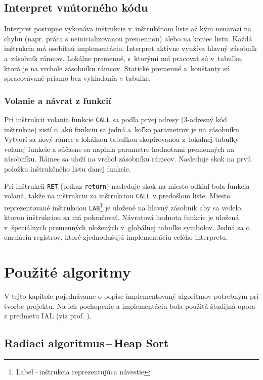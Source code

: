 \documentclass[11pt,a4paper]{article}
\begin{document}
	\subsection{Interpret vnútorného kódu}
	\label{interpret}
	Interpret postupne vykonáva inštrukcie v~inštrukčnom liste až kým nenarazí
	na chybu (napr. práca s neinicializovanou premennou) alebo na koniec listu.
	Každá inštrukcia má osobitnú implementáciu. Interpret aktívne využíva hlavný
	zásobník a~zásobník rámcov. Lokálne premenné, s~ktorými má pracovať  sú v~tabuľke,
	ktorá je na vrchole zásobníku rámcov. Statické premenné a~konštanty sú spracovávané
	priamo bez vyhľadania v tabuľke.

	\subsubsection{Volanie a návrat z funkcií}
	\label{funkcia}
	Pri inštrukcii volania funkcie \texttt{CALL} sa podľa prvej adresy
	(3-adresný kód inštrukcie) zistí o~akú funkciu sa jedná a~koľko parametrov
	je na zásobníku. Vytvorí sa nový rámec s lokálnou tabuľkou skopírovanou
	z~lokálnej tabuľky volanej funkcie a súčasne sa naplnia parametre
	hodnotami premenných na zásobníku. Rámec sa uloží na vrchol zásobníku rámcov.
	Nasleduje skok na prvú položku inštrukčného listu danej funkcie.


	Pri inštrukcii \texttt{RET} (príkaz \texttt{return}) nasleduje skok na
	miesto odkiaľ bola funkcia volaná, takže na inštrukciu za inštrukciou
	\texttt{CALL} v predošlom liste. Miesto reprezentované inštrukciou
    \texttt{LAB}\footnote{Label\,--\,inštrukcia reprezentujúca návestie}
    je uložené na hlavný zásobník aby sa vedelo, ktorou inštrukciou
	sa má pokračovať. Návratová hodnota funkcie je uložená v~špeciálnych
	premenných uložených v~globálnej tabuľke symbolov. Jedná sa o emuláciu
	registrov, ktoré zjednodušujú implementáciu celého interpretu.




	\section{Použité algoritmy}
	\label{algoritmy}

    V tejto kapitole pojednávame o popise implementovaný algoritmov potrebným pri tvorbe projektu. Na ich pochopenie a implementáciu bola použitá študijná opora z predmetu IAL (viz prof. \cite{opora}).

	\subsection{Radiaci algoritmus\,--\,Heap Sort}
\end{document}
